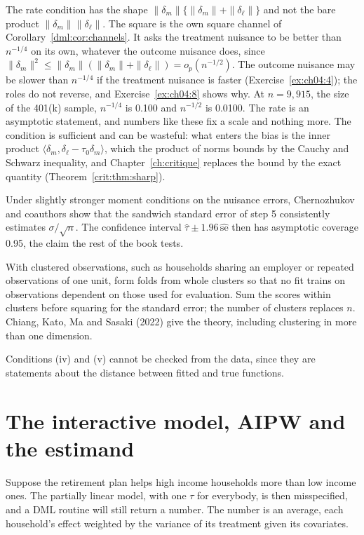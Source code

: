 The rate condition has the shape $\|\delta_m\|\{\|\delta_m\| + \|\delta_\ell\|\}$ and not the bare product $\|\delta_m\|\|\delta_\ell\|$. The square is the own square channel of Corollary~\ref{dml:cor:channels}. It asks the treatment nuisance to be better than $n^{-1/4}$ on its own, whatever the outcome nuisance does, since $\|\delta_m\|^2 \le \|\delta_m\|(\|\delta_m\| + \|\delta_\ell\|) = o_p(n^{-1/2})$. The outcome nuisance may be slower than $n^{-1/4}$ if the treatment nuisance is faster (Exercise~\ref{ex:ch04:4}); the roles do not reverse, and Exercise~\ref{ex:ch04:8} shows why. At $n = 9{,}915$, the size of the 401(k) sample, $n^{-1/4}$ is 0.100 and $n^{-1/2}$ is 0.0100. The rate is an asymptotic statement, and numbers like these fix a scale and nothing more. The condition is sufficient and can be wasteful: what enters the bias is the inner product $\langle\delta_m, \delta_\ell - \tau_0\delta_m\rangle$, which the product of norms bounds by the Cauchy and Schwarz inequality, and Chapter~\ref{ch:critique} replaces the bound by the exact quantity (Theorem~\ref{crit:thm:sharp}).

Under slightly stronger moment conditions on the nuisance errors, Chernozhukov and coauthors show that the sandwich standard error of step 5 consistently estimates $\sigma/\sqrt{n}$. The confidence interval $\hat\tau \pm 1.96\,\widehat{\mathrm{se}}$ then has asymptotic coverage 0.95, the claim the rest of the book tests.

With clustered observations, such as households sharing an employer or repeated observations of one unit, form folds from whole clusters so that no fit trains on observations dependent on those used for evaluation. Sum the scores within clusters before squaring for the standard error; the number of clusters replaces $n$. Chiang, Kato, Ma and Sasaki (2022) give the theory, including clustering in more than one dimension.

Conditions (iv) and (v) cannot be checked from the data, since they are statements about the distance between fitted and true functions. 

\section{The interactive model, AIPW and the estimand}\label{sec:dml:wate}

Suppose the retirement plan helps high income households more than low income ones. The partially linear model, with one $\tau$ for everybody, is then misspecified, and a DML routine will still return a number. The number is an average, each household's effect weighted by the variance of its treatment given its covariates.

